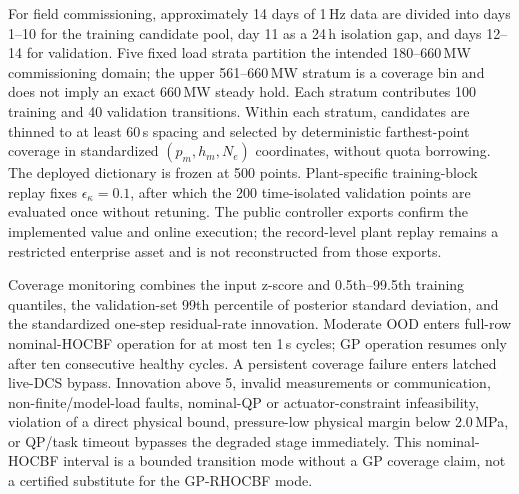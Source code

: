 For field commissioning, approximately 14 days of 1\,Hz data are divided into days 1--10 for the training candidate pool, day 11 as a 24\,h isolation gap, and days 12--14 for validation. Five fixed load strata partition the intended 180--660\,MW commissioning domain; the upper 561--660\,MW stratum is a coverage bin and does not imply an exact 660\,MW steady hold. Each stratum contributes 100 training and 40 validation transitions. Within each stratum, candidates are thinned to at least 60\,s spacing and selected by deterministic farthest-point coverage in standardized $(p_m,h_m,N_e)$ coordinates, without quota borrowing. The deployed dictionary is frozen at 500 points. Plant-specific training-block replay fixes $\epsilon_\kappa=0.1$, after which the 200 time-isolated validation points are evaluated once without retuning. The public controller exports confirm the implemented value and online execution; the record-level plant replay remains a restricted enterprise asset and is not reconstructed from those exports.

Coverage monitoring combines the input z-score and 0.5th--99.5th training quantiles, the validation-set 99th percentile of posterior standard deviation, and the standardized one-step residual-rate innovation. Moderate OOD enters full-row nominal-HOCBF operation for at most ten 1\,s cycles; GP operation resumes only after ten consecutive healthy cycles. A persistent coverage failure enters latched live-DCS bypass. Innovation above 5, invalid measurements or communication, non-finite/model-load faults, nominal-QP or actuator-constraint infeasibility, violation of a direct physical bound, pressure-low physical margin below 2.0\,MPa, or QP/task timeout bypasses the degraded stage immediately. This nominal-HOCBF interval is a bounded transition mode without a GP coverage claim, not a certified substitute for the GP-RHOCBF mode.

